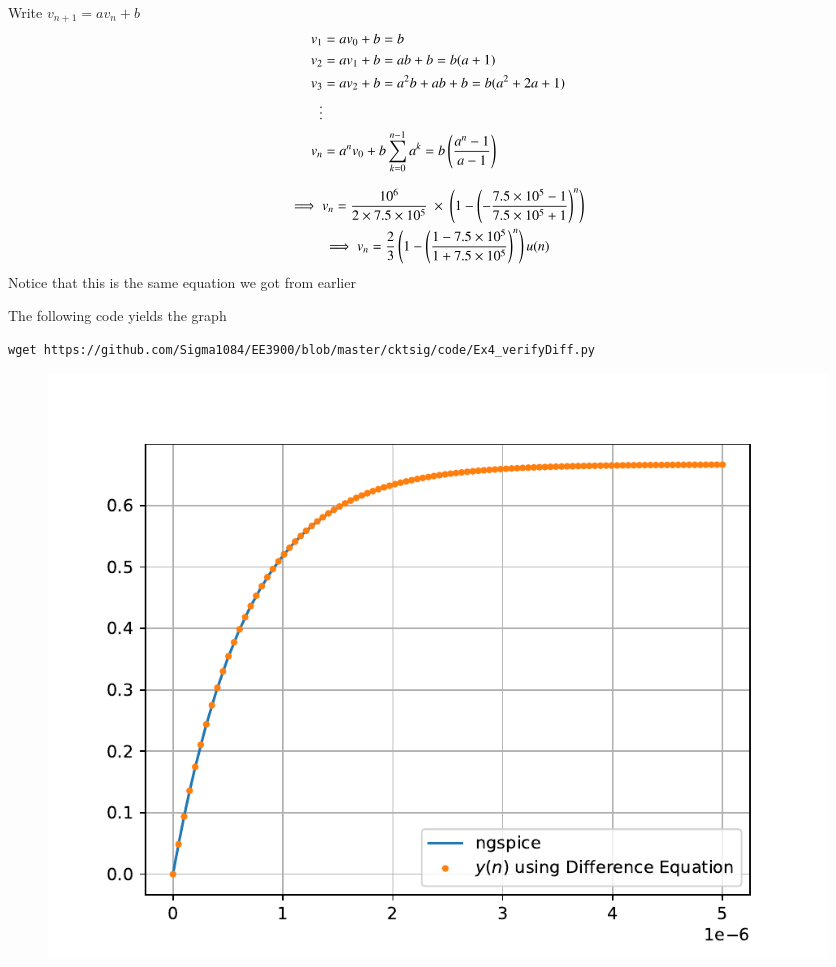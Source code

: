 \documentclass[journal,12pt,twocolumn]{IEEEtran}
\renewcommand\thesection{\arabic{section}}
\begin{document}
\begin{enumerate}[label=\arabic*.,ref=\thesection.\theenumi]
	Write \( v_{n+1} = a v_n + b \)
	\begin{align*}
		v_1 &= a v_0 + b = b \\
		v_2 &= a v_1 + b = ab + b = b(a + 1) \\
		v_3 &= a v_2 + b = a^2 b + ab + b = b(a^2 + 2a + 1) \\
		\vdots \\
		v_n &= a^n v_0 + b \sum_{k=0}^{n-1} a^k = b \left( \frac{a^n - 1}{a - 1}\right)
	\end{align*}

	\begin{gather*}
	    \implies v_n = \frac{10^6}{2 \times 7.5 \times 10^5} \ \times \
		\left(1 - \left(-\frac{7.5 \times 10^5 - 1}{7.5 \times 10^5 + 1}\right)^n\right) \\
	    \implies v_n = \frac{2}{3} \left(1 -
		\left(\frac{1 - 7.5 \times 10^5}{1 + 7.5 \times 10^5}\right)^n\right) u(n)
	\end{gather*}
	Notice that this is the same equation we got from earlier

	The following code yields the graph
	\begin{lstlisting}
wget https://github.com/Sigma1084/EE3900/blob/master/cktsig/code/Ex4_verifyDiff.py
	\end{lstlisting}

	\begin{figure}[!ht]
		\centering
		\includegraphics[width=\columnwidth]{figs/Ex4_diff}
		\caption {}
		\label{fig:q4_vd}
	\end{figure}

\end{enumerate}
\end{document}
